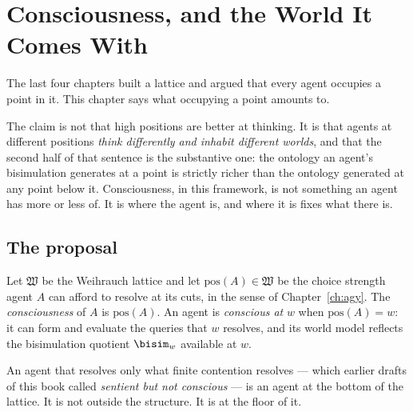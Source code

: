 \chapter{Consciousness, and the World It Comes With}
\label{sec:consciousness}

The last four chapters built a lattice and argued that every agent
occupies a point in it.
This chapter says what occupying a point amounts to.

The claim is not that high positions are better at thinking.
It is that agents at different positions \emph{think differently and
inhabit different worlds}, and that the second half of that sentence is
the substantive one: the ontology an agent's bisimulation generates at a
point is strictly richer than the ontology generated at any point below
it.
Consciousness, in this framework, is not something an agent has more or
less of.
It is where the agent is, and where it is fixes what there is.

\section{The proposal}

\begin{definition}[Consciousness]
\label{def:consciousness}
Let $\mathfrak{W}$ be the Weihrauch lattice and let
$\mathrm{pos}(A) \in \mathfrak{W}$ be the choice strength agent $A$ can
afford to resolve at its cuts, in the sense of Chapter~\ref{ch:agy}.
The \emph{consciousness} of $A$ is $\mathrm{pos}(A)$.
An agent is \emph{conscious at} $w$ when $\mathrm{pos}(A) = w$: it can
form and evaluate the queries that $w$ resolves, and its world model
reflects the bisimulation quotient $\bisim_w$ available at $w$.
\end{definition}

An agent that resolves only what finite contention resolves --- which
earlier drafts of this book called \emph{sentient but not conscious} ---
is an agent at the bottom of the lattice.
It is not outside the structure.
It is at the floor of it.

